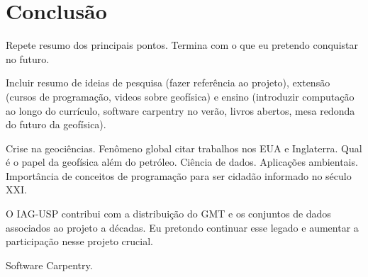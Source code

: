 \documentclass[10pt,a4paper,oneside]{book}
\begin{document}
\chapter{Conclusão}
\label{cap_conclusao}

Repete resumo dos principais pontos.
Termina com o que eu pretendo conquistar no futuro.

Incluir resumo de ideias de pesquisa (fazer referência ao projeto),
extensão (cursos de programação, videos sobre geofísica) e ensino (introduzir
computação ao longo do currículo, software carpentry no verão, livros abertos,
mesa redonda do futuro da geofísica).

Crise na geociências.
Fenômeno global citar trabalhos nos EUA e Inglaterra.
Qual é o papel da geofísica além do petróleo.
Ciência de dados.
Aplicações ambientais.
Importância de conceitos de programação para ser cidadão informado no século XXI.

O IAG-USP contribui com a distribuição do GMT e os conjuntos de dados
associados ao projeto a décadas.
Eu pretondo continuar esse legado e aumentar a participação nesse projeto
crucial.

Software Carpentry.




\backmatter


\end{document}

